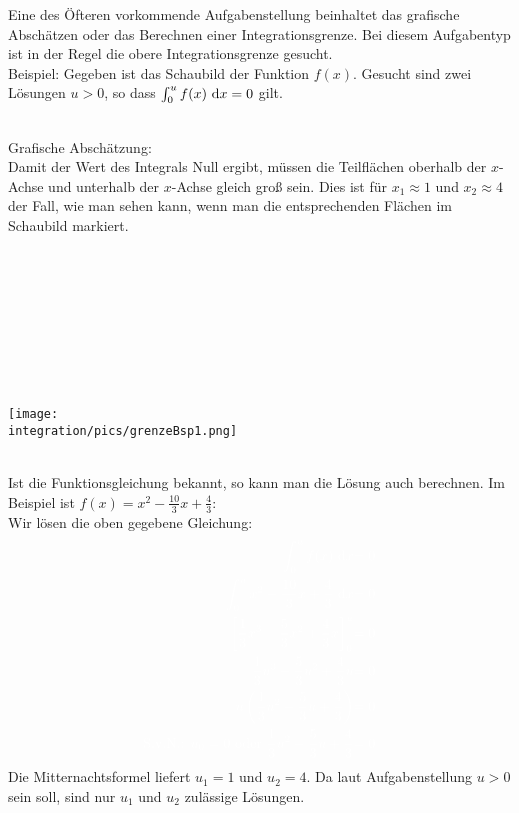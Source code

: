 Eine des Öfteren vorkommende Aufgabenstellung beinhaltet das grafische Abschätzen oder das Berechnen einer Integrationsgrenze. Bei diesem Aufgabentyp ist in der Regel die obere Integrationsgrenze gesucht.\\
Beispiel: Gegeben ist das Schaubild der Funktion \(f(x)\). Gesucht sind zwei Lösungen \(u>0\), so dass \(\int_0^u f(x) \ \text{d} x=0\) gilt.\\ \\
\begin{minipage}{\textwidth}
	\begin{minipage}{.5\textwidth}\raggedright
		Grafische Abschätzung:\\
		\textcolor{loes}{Damit der Wert des Integrals Null ergibt, müssen die Teilflächen oberhalb der \(x\)-Achse und unterhalb der \(x\)-Achse gleich groß sein. Dies ist für \(x_1\approx 1\) und \(x_2\approx 4\) der Fall, wie man sehen kann, wenn man die entsprechenden Flächen im Schaubild markiert.}\\
		\phantom{text}\\
		\phantom{text}\\
		\phantom{text}\\
		\phantom{text}\\
		\phantom{text}\\
		\phantom{text}\\
		\phantom{text}\\
		\phantom{text}\\
	\end{minipage}
	\begin{minipage}{.5\textwidth}
		\texttt{[image: \\integration/pics/grenzeBsp1.png]}
	\end{minipage}
\end{minipage}\vspace{\baselineskip}\\
Ist die Funktionsgleichung bekannt, so kann man die Lösung auch berechnen. Im Beispiel ist \(f(x)=x^2-\frac{10}{3}x+\frac{4}{3}\):\\
\textcolor{loes}{Wir lösen die oben gegebene Gleichung:}
\begin{align*}
	\textcolor{loes}{\int_0^u f(x) \td x}&\textcolor{loes}{=0}\\
	\textcolor{loes}{\int_0^u x^2-\frac{10}{3}x+\frac{4}{3} \td x}&\textcolor{loes}{=0}\\
	\textcolor{loes}{\left[\frac{1}{3}x^3-\frac{5}{3}x^2+\frac{4}{3}x \right]_0^u}&\textcolor{loes}{=0}\\
	\textcolor{loes}{\frac{1}{3}u^3-\frac{5}{3}u^2+\frac{4}{3}u}&\textcolor{loes}{=0}\\
	\textcolor{loes}{u\left(\frac{1}{3}u^2-\frac{5}{3}u+\frac{4}{3}\right)}&\textcolor{loes}{=0}\\	
	\textcolor{loes}{\text{S.v.N.: }u_0=0\text{ oder }\frac{1}{3}u^2-\frac{5}{3}u+\frac{4}{3}}&\textcolor{loes}{=0}
\end{align*}
\textcolor{loes}{Die Mitternachtsformel liefert \(u_1=1\) und \(u_2=4\). Da laut Aufgabenstellung \(u>0\) sein soll, sind nur \(u_1\) und \(u_2\) zulässige Lösungen.}
\newpage

